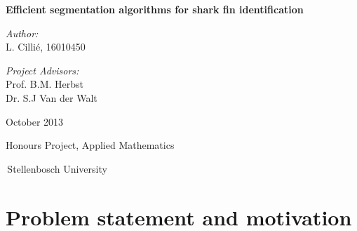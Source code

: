 \documentclass[a4paper,10pt]{article}
\newenvironment{changemargin}[2]{%
\begin{list}{}{%
\setlength{\topsep}{0pt}%
\setlength{\leftmargin}{#1}%
\setlength{\rightmargin}{#2}%
\setlength{\listparindent}{\parindent}%
\setlength{\itemindent}{\parindent}%
\setlength{\parsep}{\parskip}%
}%
\item[]}{\end{list}}
\begin{document}
\begin{titlepage}

\begin{changemargin}{-1cm}{-1cm}
\begin{center}

\begin{minipage}{1.2\textwidth}
\begin{center}
\vspace{2cm}
    {\Huge \bf Efficient segmentation algorithms for shark fin
identification }
\end{center}
\end{minipage}

\vspace{1.3cm}

\begin{minipage}{0.49\textwidth}
\begin{center} \LARGE
\emph{Author:}\\
L. Cilli\'{e}, 16010450
\end{center}
\end{minipage}
\begin{minipage}{0.49\textwidth}
\begin{center} \LARGE
\emph{Project Advisors:} \\
Prof. B.M. Herbst\\Dr. S.J Van der Walt

\end{center}
\end{minipage}

\vspace{1.3cm}
{\LARGE October 2013}

\end{center}

\vfill

\vspace{20mm}
\hfill{\LARGE Honours Project, Applied Mathematics}\hfill\,

\,\hfill{\LARGE Stellenbosch University}\hfill\,

\end{changemargin}

\end{titlepage}

\begin{abstract}
 
\end{abstract}


\newpage
\tableofcontents

\newpage
\section{Problem statement and motivation}
\end{document}
